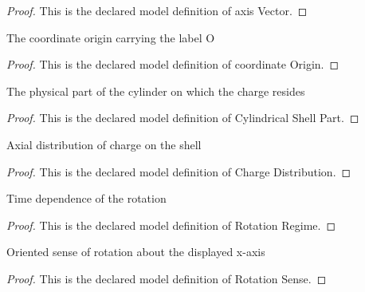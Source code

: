 \begin{proof}
  This is the declared model definition of axis Vector.
\end{proof}
\begin{definition}
  \label{def:physics:phyx-mini-0969:phyxminiproblems-problemphyxmini0969-coordinateorigin}
  The coordinate origin carrying the label O
\end{definition}
\begin{proof}
  This is the declared model definition of coordinate Origin.
\end{proof}
\begin{definition}
  \label{def:physics:phyx-mini-0969:phyxminiproblems-problemphyxmini0969-cylindricalshellpart}
  The physical part of the cylinder on which the charge resides
\end{definition}
\begin{proof}
  This is the declared model definition of Cylindrical Shell Part.
\end{proof}
\begin{definition}
  \label{def:physics:phyx-mini-0969:phyxminiproblems-problemphyxmini0969-chargedistribution}
  Axial distribution of charge on the shell
\end{definition}
\begin{proof}
  This is the declared model definition of Charge Distribution.
\end{proof}
\begin{definition}
  \label{def:physics:phyx-mini-0969:phyxminiproblems-problemphyxmini0969-rotationregime}
  Time dependence of the rotation
\end{definition}
\begin{proof}
  This is the declared model definition of Rotation Regime.
\end{proof}
\begin{definition}
  \label{def:physics:phyx-mini-0969:phyxminiproblems-problemphyxmini0969-rotationsense}
  Oriented sense of rotation about the displayed x-axis
\end{definition}
\begin{proof}
  This is the declared model definition of Rotation Sense.
\end{proof}
